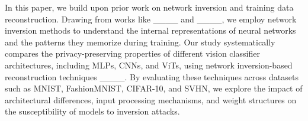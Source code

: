 In this paper, we build upon prior work on network inversion and training data reconstruction. Drawing from works like ____ and ____, we employ network inversion methods to understand the internal representations of neural networks and the patterns they memorize during training. Our study systematically compares the privacy-preserving properties of different vision classifier architectures, including MLPs, CNNs, and ViTs, using network inversion-based reconstruction techniques ____. By evaluating these techniques across datasets such as MNIST, FashionMNIST, CIFAR-10, and SVHN, we explore the impact of architectural differences, input processing mechanisms, and weight structures on the susceptibility of models to inversion attacks.